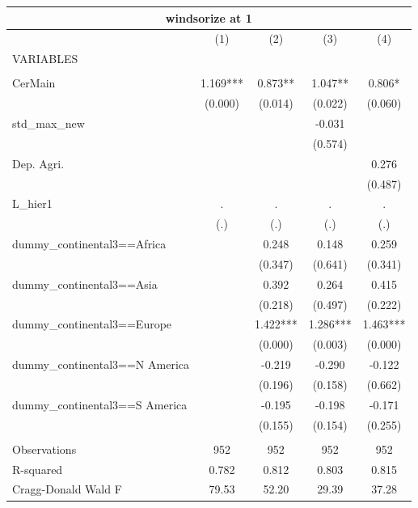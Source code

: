\documentclass[12pt,a4paper]{article}
\begin{document}
\begin{tabular}{lcccc}
\multicolumn{5}{c}{windsorize at 1} \\ \hline
 & (1) & (2) & (3) & (4) \\
VARIABLES &  &  &  &  \\ \hline
 &  &  &  &  \\
CerMain & 1.169*** & 0.873** & 1.047** & 0.806* \\
 & (0.000) & (0.014) & (0.022) & (0.060) \\
std\_max\_new &  &  & -0.031 &  \\
 &  &  & (0.574) &  \\
Dep. Agri. &  &  &  & 0.276 \\
 &  &  &  & (0.487) \\
L\_hier1 & . & . & . & . \\
 & (.) & (.) & (.) & (.) \\
dummy\_continental3==Africa &  & 0.248 & 0.148 & 0.259 \\
 &  & (0.347) & (0.641) & (0.341) \\
dummy\_continental3==Asia &  & 0.392 & 0.264 & 0.415 \\
 &  & (0.218) & (0.497) & (0.222) \\
dummy\_continental3==Europe &  & 1.422*** & 1.286*** & 1.463*** \\
 &  & (0.000) & (0.003) & (0.000) \\
dummy\_continental3==N America &  & -0.219 & -0.290 & -0.122 \\
 &  & (0.196) & (0.158) & (0.662) \\
dummy\_continental3==S America &  & -0.195 & -0.198 & -0.171 \\
 &  & (0.155) & (0.154) & (0.255) \\
 &  &  &  &  \\
Observations & 952 & 952 & 952 & 952 \\
R-squared & 0.782 & 0.812 & 0.803 & 0.815 \\
 Cragg-Donald Wald F & 79.53 & 52.20 & 29.39 & 37.28 \\ \hline
\end{tabular}
\end{document}

